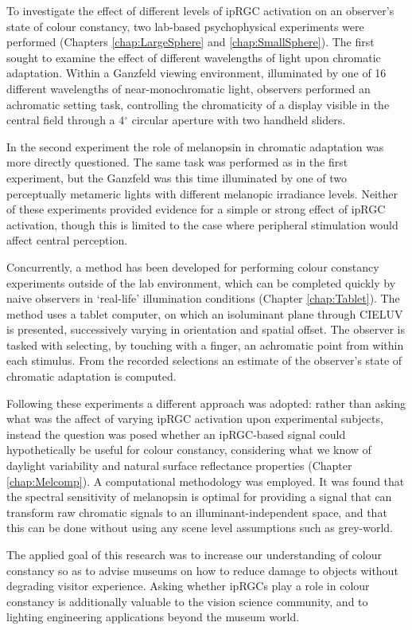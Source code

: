 To investigate the effect of different levels of \gls{ipRGC} activation on an observer's state of colour constancy, two lab-based psychophysical experiments were performed (Chapters \ref{chap:LargeSphere} and \ref{chap:SmallSphere}). The first sought to examine the effect of different wavelengths of light upon chromatic adaptation. Within a Ganzfeld viewing environment, illuminated by one of 16 different wavelengths of near-monochromatic light, observers performed an achromatic setting task, controlling the chromaticity of a display visible in the central field through a 4$^{\circ}$ circular aperture with two handheld sliders.

In the second experiment the role of melanopsin in chromatic adaptation was more directly questioned. The same task was performed as in the first experiment, but the Ganzfeld was this time illuminated by one of two perceptually metameric lights with different melanopic irradiance levels. Neither of these experiments provided evidence for a simple or strong effect of ipRGC activation, though this is limited to the case where peripheral stimulation would affect central perception.

Concurrently, a method has been developed for performing colour constancy experiments outside of the lab environment, which can be completed quickly by naive observers in `real-life' illumination conditions (Chapter \ref{chap:Tablet}). The method uses a tablet computer, on which an isoluminant plane through CIELUV is presented, successively varying in orientation and spatial offset. The observer is tasked with selecting, by touching with a finger, an achromatic point from within each stimulus. From the recorded selections an estimate of the observer's state of chromatic adaptation is computed.

Following these experiments a different approach was adopted: rather than asking what was the affect of varying \gls{ipRGC} activation upon experimental subjects, instead the question was posed whether an \gls{ipRGC}-based signal could hypothetically be useful for colour constancy, considering what we know of daylight variability and natural surface reflectance properties (Chapter \ref{chap:Melcomp}). A computational methodology was employed. It was found that the spectral sensitivity of melanopsin is optimal for providing a signal that can transform raw chromatic signals to an illuminant-independent space, and that this can be done without using any scene level assumptions such as grey-world.

The applied goal of this research was to increase our understanding of colour constancy so as to advise museums on how to reduce damage to objects without degrading visitor experience. Asking whether \glspl{ipRGC} play a role in colour constancy is additionally valuable to the vision science community, and to lighting engineering applications beyond the museum world.


